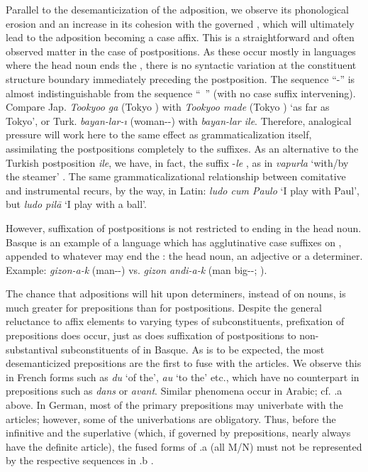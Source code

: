 Parallel to the desemanticization of the adposition, we observe its phonological erosion and an increase in its cohesion with the governed \np, which will ultimately lead to the adposition becoming a case affix. This is a straightforward and often observed matter in the case of postpositions. As these occur mostly in languages where the head noun ends the \np, there is no syntactic variation at the constituent structure boundary immediately preceding the postposition. The sequence ``\np-\case'' is almost indistinguishable from the sequence ``\np~\postp'' (with no case suffix intervening). Compare Jap. \textit{Tookyoo ga} (Tokyo \glnom) with \textit{Tookyoo made} (Tokyo \term) `as far as Tokyo', or Turk. \textit{bayan-lar-ı} (woman-\glpl-\glacc) with \textit{bayan-lar ile}. Therefore, analogical pressure will work here to the same effect as grammaticalization itself, assimilating the postpositions completely to the suffixes.\label{page89} As an alternative to the Turkish postposition \textit{ile}, we have, in fact, the suffix -\textit{le} \inst, as in \textit{vapurla} ‘with/by the steamer’ \citep[63]{Wendt1972}. The same grammaticalizational relationship between comitative and instrumental recurs, by the way, in Latin: \textit{ludo cum Paulo} ‘I play with Paul’, but \textit{ludo pil\=a} ‘I play with a ball’.

However, suffixation of postpositions is not restricted to \nps ending in the head noun. Basque is an example of a language which has agglutinative case suffixes on \nps, appended to whatever may end the \np: the head noun, an adjective or a determiner. Example: \textit{gizon-a-k} (man-\gldef-\glerg) vs. \textit{gizon andi-a-k} (man big-\gldef-\glerg; \citealt[69]{Brettschneider1978}).

The chance that adpositions will hit upon determiners, instead of on nouns, is much greater for prepositions than for postpositions. Despite the general reluctance to affix elements to varying types of subconstituents, prefixation of prepositions does occur, just as does suffixation of postpositions to non-substantival subconstituents of \nps in Basque. As is to be expected, the most desemanticized prepositions are the first to fuse with the articles. We observe this in French forms such as \textit{du} ‘of the’, \textit{au} ‘to the’ etc., which have no counterpart in prepositions such as \textit{dans} or \textit{avant}. Similar phenomena occur in Arabic; cf. .a above. In German, most of the primary prepositions may univerbate with the articles; however, some of the univerbations are obligatory. Thus, before the infinitive and the superlative (which, if governed by prepositions, nearly always have the definite article), the fused forms of .a (all M/N) must not be represented by the respective sequences in .b \citep[36]{Vater1979}.

